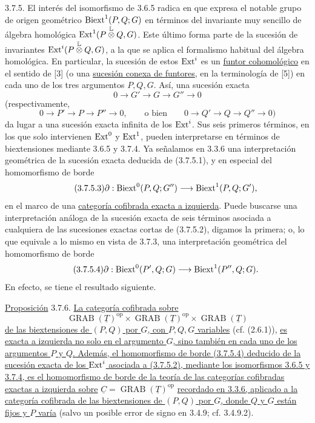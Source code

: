 3.7.5. El interés del isomorfismo de 3.6.5 radica en que expresa el
notable grupo de origen geométrico $\operatorname{Biext}^1(P,Q;G)$ en términos del
invariante muy sencillo de álgebra homológica
$\operatorname{Ext}^1(P\mathbin{\overset{\mathbb L}{\otimes}}Q,G)$. Este último
forma parte de la sucesión de invariantes
$\operatorname{Ext}^i(P\mathbin{\overset{\mathbb L}{\otimes}}Q,G)$, a la que se
aplica el formalismo habitual del álgebra homológica. En particular,
la sucesión de estos $\operatorname{Ext}^i$ es un \underline{funtor cohomológico} en
el sentido de [3] (o una \underline{sucesión conexa de funtores},
en la terminología de [5]) en cada uno de los tres argumentos
$P,Q,G$. Así, una sucesión exacta
\begin{equation}\tag{3.7.5.1}
 0\longrightarrow G'\longrightarrow G\longrightarrow G''
 \longrightarrow0
\end{equation}
(respectivamente,
\begin{equation}\tag{3.7.5.2}
 0\longrightarrow P'\longrightarrow P\longrightarrow P''
 \longrightarrow0,\qquad\text{o bien}\qquad
 0\longrightarrow Q'\longrightarrow Q\longrightarrow Q''
 \longrightarrow0)
\end{equation}
da lugar a una sucesión exacta infinita de los $\operatorname{Ext}^i$. Sus seis
primeros términos, en los que solo intervienen $\operatorname{Ext}^0$ y $\operatorname{Ext}^1$,
pueden interpretarse en términos de biextensiones mediante 3.6.5 y
3.7.4. Ya señalamos en 3.3.6 una interpretación geométrica de la
sucesión exacta deducida de (3.7.5.1), y en especial del homomorfismo
de borde
\begin{equation}\tag{3.7.5.3}
 \partial:\operatorname{Biext}^0(P,Q;G'')\longrightarrow
 \operatorname{Biext}^1(P,Q;G'),
\end{equation}
en el marco de una \underline{categoría cofibrada exacta a izquierda}.
Puede buscarse una interpretación análoga de la sucesión exacta de
seis términos asociada a cualquiera de las sucesiones exactas cortas
de (3.7.5.2), digamos la primera; o, lo que equivale a lo mismo en
vista de 3.7.3, una interpretación geométrica del homomorfismo de borde
\begin{equation}\tag{3.7.5.4}
 \partial:\operatorname{Biext}^0(P',Q;G)\longrightarrow
 \operatorname{Biext}^1(P'',Q;G).
\end{equation}
En efecto, se tiene el resultado siguiente.

\underline{Proposición} 3.7.6. \underline{La categoría cofibrada sobre}
\[
 \operatorname{GRAB}(\underline T)^{\mathrm{op}}
 \times\operatorname{GRAB}(\underline T)^{\mathrm{op}}
 \times\operatorname{GRAB}(\underline T)
\]
\underline{de las biextensiones de $(P,Q)$ por $G$, con $P,Q,G$
variables} (cf. (2.6.1)), \underline{es exacta a izquierda no solo en
el argumento $G$, sino también en cada uno de los argumentos $P$ y
$Q$. Además, el homomorfismo de borde (3.7.5.4) deducido de la
sucesión exacta de los $\operatorname{Ext}^i$ asociada a (3.7.5.2), mediante los
isomorfismos 3.6.5 y 3.7.4, es el homomorfismo de borde de la teoría de
las categorías cofibradas exactas a izquierda sobre}
$\underline C=\operatorname{GRAB}(\underline T)^{\mathrm{op}}$
\underline{recordado en 3.3.6, aplicado a la categoría cofibrada de
las biextensiones de $(P,Q)$ por $G$, donde $Q$ y $G$ están fijos y
$P$ varía} (salvo un posible error de signo en 3.4.9; cf. 3.4.9.2).

